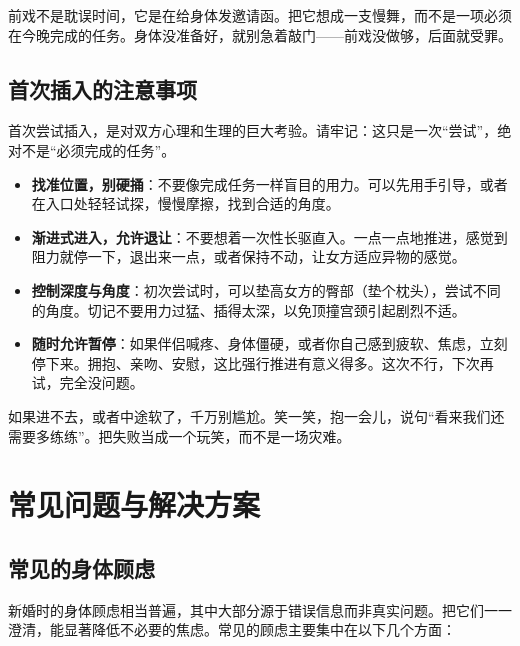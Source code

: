 \documentclass[12pt,UTF8]{ctexbook}
\begin{document}
\begin{tcolorbox}[colback=pink!5!white,colframe=red!50!black,title=贴心小叮咛]
前戏不是耽误时间，它是在给身体发邀请函。把它想成一支慢舞，而不是一项必须在今晚完成的任务。身体没准备好，就别急着敲门——前戏没做够，后面就受罪。
\end{tcolorbox}

\subsection{首次插入的注意事项}

首次尝试插入，是对双方心理和生理的巨大考验。请牢记：这只是一次“尝试”，绝对不是“必须完成的任务”。

\begin{itemize}
\item \textbf{找准位置，别硬捅}：不要像完成任务一样盲目的用力。可以先用手引导，或者在入口处轻轻试探，慢慢摩擦，找到合适的角度。
\item \textbf{渐进式进入，允许退让}：不要想着一次性长驱直入。一点一点地推进，感觉到阻力就停一下，退出来一点，或者保持不动，让女方适应异物的感觉。
\item \textbf{控制深度与角度}：初次尝试时，可以垫高女方的臀部（垫个枕头），尝试不同的角度。切记不要用力过猛、插得太深，以免顶撞宫颈引起剧烈不适。
\item \textbf{随时允许暂停}：如果伴侣喊疼、身体僵硬，或者你自己感到疲软、焦虑，立刻停下来。拥抱、亲吻、安慰，这比强行推进有意义得多。这次不行，下次再试，完全没问题。
\end{itemize}

\begin{tcolorbox}[colback=pink!5!white,colframe=red!50!black,title=贴心小叮咛]
如果进不去，或者中途软了，千万别尴尬。笑一笑，抱一会儿，说句“看来我们还需要多练练”。把失败当成一个玩笑，而不是一场灾难。
\end{tcolorbox}

\section{常见问题与解决方案}

\subsection{常见的身体顾虑}

新婚时的身体顾虑相当普遍，其中大部分源于错误信息而非真实问题。把它们一一澄清，能显著降低不必要的焦虑。常见的顾虑主要集中在以下几个方面：
\end{document}
